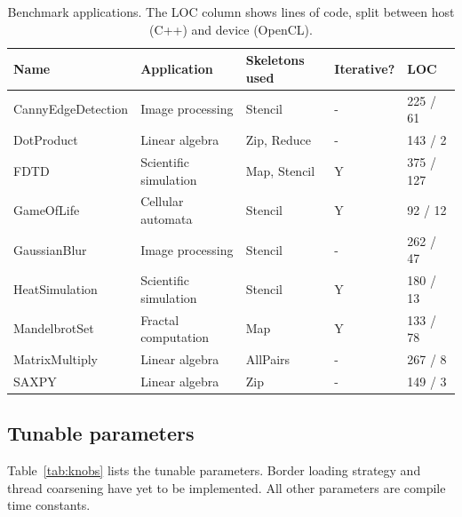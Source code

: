 \begin{table}
\footnotesize
\centering
\begin{tabular}{| l | l | l | l | l |}
\hline
\textbf{Name} & \textbf{Application} & \textbf{Skeletons used} & \textbf{Iterative?} & \textbf{LOC}\\
\hline
CannyEdgeDetection & Image processing & Stencil & - & 225 / 61\\
DotProduct & Linear algebra & Zip, Reduce & - & 143 / 2\\
FDTD & Scientific simulation & Map, Stencil & Y & 375 / 127\\
GameOfLife & Cellular automata & Stencil & Y & 92 / 12\\
GaussianBlur & Image processing & Stencil & - & 262 / 47\\
HeatSimulation & Scientific simulation & Stencil & Y & 180 / 13\\
MandelbrotSet & Fractal computation & Map & Y & 133 / 78\\
MatrixMultiply & Linear algebra & AllPairs & - & 267 / 8\\
SAXPY & Linear algebra & Zip & - & 149 / 3\\
\hline
\end{tabular}
\caption{Benchmark applications. The LOC column shows lines of code, split between host (C++) and device (OpenCL).}
\label{tab:benchmarks}
\end{table}

\subsection{Tunable parameters}

Table~\ref{tab:knobs} lists the tunable parameters. Border loading
strategy and thread coarsening have yet to be implemented. All other
parameters are compile time constants.


